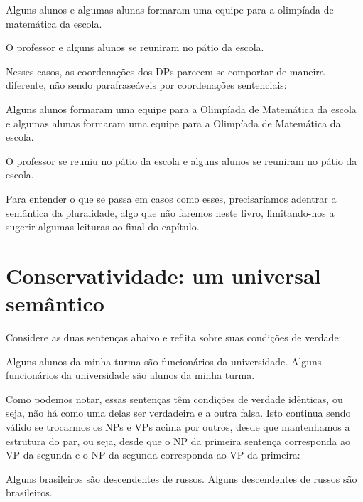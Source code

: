 \begin{exe}
	\ex Alguns alunos e algumas alunas formaram uma equipe para a olimpíada de matemática da escola.
	
	\ex O professor e alguns alunos se reuniram no pátio da escola.
\end{exe} 

\n Nesses casos, as coordenações dos DPs parecem se comportar de maneira diferente, não sendo parafraseáveis por coordenações sentenciais:

\begin{exe}
	
	\ex Alguns alunos formaram uma equipe para a Olimpíada de Matemática da escola e algumas alunas formaram uma equipe para a Olimpíada de Matemática da escola.
	
	\ex O professor se reuniu no pátio da escola e alguns alunos se reuniram no pátio da escola.
	
\end{exe} 


\n Para entender o que se passa em casos como esses, precisaríamos adentrar a semântica da pluralidade, algo que não faremos neste livro, limitando-nos a sugerir algumas leituras ao final do capítulo.

\section{Conservatividade: um universal semântico}

Considere as duas sentenças abaixo e reflita sobre suas condições
de verdade:


\begin{exe}
    \ex\label{prop}
    \begin{xlist}
        \ex  Alguns alunos da minha turma são funcionários da universidade.\label{propa}
        \ex  Alguns funcionários da universidade são alunos da minha tur\-ma.\label{propc}
    \end{xlist}
\end{exe}

\n Como podemos notar, essas sentenças têm condições de verdade
idênticas, ou seja, não há como uma delas ser verdadeira e a outra
falsa. Isto continua sendo válido se trocarmos os NPs e VPs acima
por outros, desde que mantenhamos a estrutura do par, ou seja, desde
que o NP da primeira sentença corresponda ao VP da segunda e o NP
da segunda corresponda ao VP da primeira:


\begin{exe}
    \ex\label{ch}
    \begin{xlist}
        \ex  Alguns brasileiros são descendentes de
        russos.\label{cha}
        \ex  Alguns descendentes de russos são brasileiros.\label{chc}
    \end{xlist}
\end{exe}

